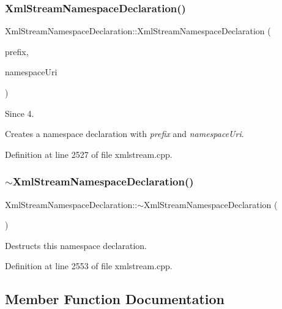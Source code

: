 \subsubsection{\texorpdfstring{Xml\+Stream\+Namespace\+Declaration()}{XmlStreamNamespaceDeclaration()}\hspace{0.1cm}{\footnotesize\ttfamily [3/3]}}
{\footnotesize\ttfamily Xml\+Stream\+Namespace\+Declaration\+::\+Xml\+Stream\+Namespace\+Declaration (\begin{DoxyParamCaption}\item[{const Q\+String \&}]{prefix,  }\item[{const Q\+String \&}]{namespace\+Uri }\end{DoxyParamCaption})}

\begin{DoxySince}{Since}
4.
\end{DoxySince}
Creates a namespace declaration with {\itshape prefix} and {\itshape namespace\+Uri}. 

Definition at line 2527 of file xmlstream.\+cpp.

\mbox{\label{class_xml_stream_namespace_declaration_a682a9243d890610af2b680b8feb2145e}} 
\subsubsection{\texorpdfstring{$\sim$\+Xml\+Stream\+Namespace\+Declaration()}{~XmlStreamNamespaceDeclaration()}}
{\footnotesize\ttfamily Xml\+Stream\+Namespace\+Declaration\+::$\sim$\+Xml\+Stream\+Namespace\+Declaration (\begin{DoxyParamCaption}{ }\end{DoxyParamCaption})}

Destructs this namespace declaration. 

Definition at line 2553 of file xmlstream.\+cpp.



\subsection{Member Function Documentation}
\mbox{\label{class_xml_stream_namespace_declaration_ac2d6510eeacc33073402389403e2c3ef}} 
